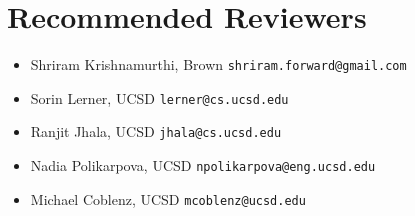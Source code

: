 \section*{Recommended Reviewers}


\begin{itemize}
  \item Shriram Krishnamurthi, Brown \texttt{shriram.forward@gmail.com}
  \item Sorin Lerner, UCSD \texttt{lerner@cs.ucsd.edu}
  \item Ranjit Jhala, UCSD \texttt{jhala@cs.ucsd.edu}
  \item Nadia Polikarpova, UCSD \texttt{npolikarpova@eng.ucsd.edu}
  \item Michael Coblenz, UCSD \texttt{mcoblenz@ucsd.edu}
\end{itemize}